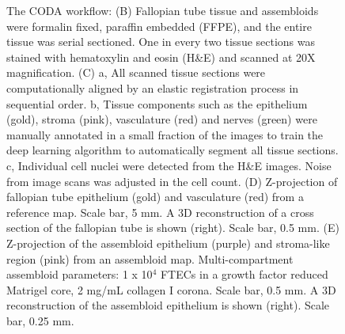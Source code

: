 \begin{refsection}
    \begin{figure}[h!]
        \ContinuedFloat
        \captionsetup{font=small}
        \caption[]{The CODA workflow: (B) Fallopian tube tissue and assembloids were formalin fixed, paraffin embedded (FFPE),  and the entire tissue was serial sectioned. One in every two tissue sections was stained with hematoxylin and eosin (H&E) and scanned at 20X magnification. (C) a, All scanned tissue sections were computationally aligned by an elastic registration process in sequential order. b, Tissue components such as the epithelium (gold), stroma (pink), vasculature (red) and nerves (green) were manually annotated in a small fraction of the images to train the deep learning algorithm to automatically segment all tissue sections. c, Individual cell nuclei were detected from the H&E images. Noise from image scans was adjusted in the cell count. (D) Z-projection of fallopian tube epithelium (gold) and vasculature (red) from a reference map. Scale bar, 5 mm. A 3D reconstruction of a cross section of the fallopian tube is shown (right). Scale bar, 0.5 mm. (E) Z-projection of the assembloid epithelium (purple) and stroma-like region (pink) from an assembloid map. Multi-compartment assembloid parameters: 1 x 10$^4$ FTECs in a growth factor reduced Matrigel core, 2 mg/mL collagen I corona. Scale bar, 0.5 mm. A 3D reconstruction of the assembloid epithelium is shown (right). Scale bar, 0.25 mm.}
    \end{figure}


\end{refsection}
